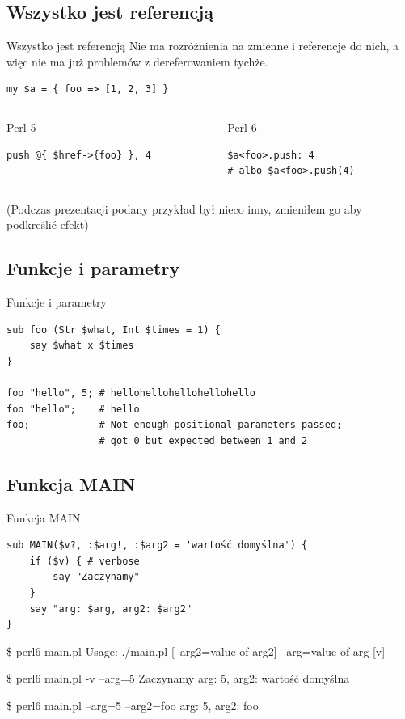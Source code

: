 \documentclass{beamer}
\begin{document}
			\subsection{Wszystko jest referencją}
\begin{frame}[fragile]{Wszystko jest referencją}
	Nie ma rozróżnienia na zmienne i referencje do nich,
	a więc nie ma już problemów z dereferowaniem tychże.
	\begin{verbatim}
my $a = { foo => [1, 2, 3] }
	\end{verbatim}
	\begin{columns}[t]
		\begin{column}{0.5\textwidth}
			\begin{block}{Perl 5}
				\begin{verbatim}
push @{ $href->{foo} }, 4
				\end{verbatim}
			\end{block}
		\end{column}
		\begin{column}{0.5\textwidth}
			\begin{block}{Perl 6}
				\begin{verbatim}
$a<foo>.push: 4
# albo $a<foo>.push(4)
				\end{verbatim}
			\end{block}
		\end{column}
	\end{columns}
{\scriptsize(Podczas prezentacji podany przykład był nieco inny,
zmieniłem go aby podkreślić efekt)}
\end{frame}
			\subsection{Funkcje i parametry}
\begin{frame}[fragile]{Funkcje i parametry}
	\begin{verbatim}
sub foo (Str $what, Int $times = 1) {
    say $what x $times
}

foo "hello", 5; # hellohellohellohellohello
foo "hello";    # hello
foo;            # Not enough positional parameters passed;
                # got 0 but expected between 1 and 2
	\end{verbatim}
\end{frame}
			\subsection{Funkcja MAIN}
\begin{frame}[fragile]{Funkcja MAIN}
\small
\begin{verbatim}
sub MAIN($v?, :$arg!, :$arg2 = 'wartość domyślna') {
    if ($v) { # verbose
        say "Zaczynamy"
    }
    say "arg: $arg, arg2: $arg2"
}
\end{verbatim}
\begin{semiverbatim}
\$ \alert{perl6 main.pl}
Usage:
./main.pl [--arg2=value-of-arg2] --arg=value-of-arg [v]

\$ \alert{perl6 main.pl -v --arg=5}
Zaczynamy
arg: 5, arg2: wartość domyślna

\$ \alert{perl6 main.pl --arg=5 --arg2=foo}
arg: 5, arg2: foo
\end{semiverbatim}
\end{frame}
\end{document}
